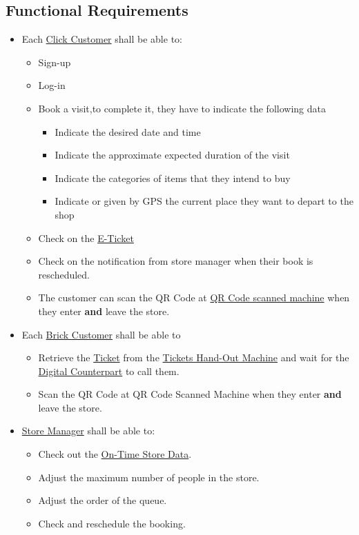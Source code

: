 \documentclass[a4paper,12pt]{report}
\begin{document}
\subsection{Functional Requirements}
\begin{itemize}
	\item Each \hyperref[Definitions]{Click Customer} shall be able to: 
	\begin{itemize}
		\item Sign-up 
		\item Log-in
		\item Book a visit,to complete it, they have to indicate the following data
		\begin{itemize}
			\item Indicate the desired date and time
			\item Indicate the approximate expected duration of the visit
			\item Indicate the categories of items that they intend to buy
			\item Indicate or given by GPS the current place they want to depart to the shop
		\end{itemize}
		\item Check on the \hyperref[Definitions]{E-Ticket} 
		\item Check on the notification from store manager when their book is rescheduled.
		\item The customer can scan the QR Code at \hyperref[Definitions]{QR Code scanned machine} when they enter \textbf{and} leave the store.
	\end{itemize}

	\item Each \hyperref[Definitions]{Brick Customer} shall be able to
	\begin{itemize}
		\item Retrieve the \hyperref[Definitions]{Ticket} from the \hyperref[Definitions]{Tickets Hand-Out Machine} and wait for the \hyperref[Definitions]{Digital Counterpart} to call them.
		\item Scan the QR Code at QR Code Scanned Machine when they enter \textbf{and} leave the store.
	\end{itemize}

	\item \hyperref[Definitions]{Store Manager} shall be able to: 
	\begin{itemize}
		\item Check out the \hyperref[Definitions]{On-Time Store Data}.
		\item Adjust the maximum number of people in the store.
		\item Adjust the order of the queue.
		\item Check and reschedule the booking.
	\end{itemize}


\end{itemize}
\end{document}

